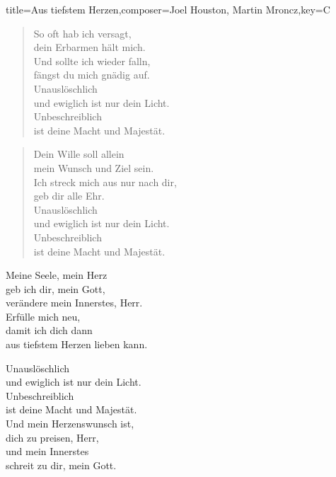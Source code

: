 \documentclass[]{leadsheet}
\begin{document}
\begin{song}{title={Aus tiefstem Herzen},composer={Joel Houston, Martin Mroncz},key={C}}

\begin{verse}
So oft hab ich versagt, \\
dein Erbarmen hält mich. \\
Und sollte ich wieder falln, \\
fängst du mich gnädig auf. \\
Unauslöschlich \\
und ewiglich ist nur dein Licht. \\
Unbeschreiblich \\
ist deine Macht und Majestät. \\
\end{verse}

\begin{verse}
Dein Wille soll allein \\
mein Wunsch und Ziel sein. \\
Ich streck mich aus nur nach dir, \\
geb dir alle Ehr. \\
Unauslöschlich \\
und ewiglich ist nur dein Licht. \\
Unbeschreiblich \\
ist deine Macht und Majestät. \\
\end{verse}

\begin{chorus}
Meine Seele, mein Herz \\
geb ich dir, mein Gott, \\
verändere mein Innerstes, Herr. \\
Erfülle mich neu, \\
damit ich dich dann \\
aus tiefstem Herzen lieben kann. \\
\end{chorus}

\begin{chorus}
Unauslöschlich \\
und ewiglich ist nur dein Licht. \\
Unbeschreiblich \\
ist deine Macht und Majestät. \\
Und mein Herzenswunsch ist, \\
dich zu preisen, Herr, \\
und mein Innerstes \\
schreit zu dir, mein Gott. \\
\end{chorus}

\end{song}
\end{document}
